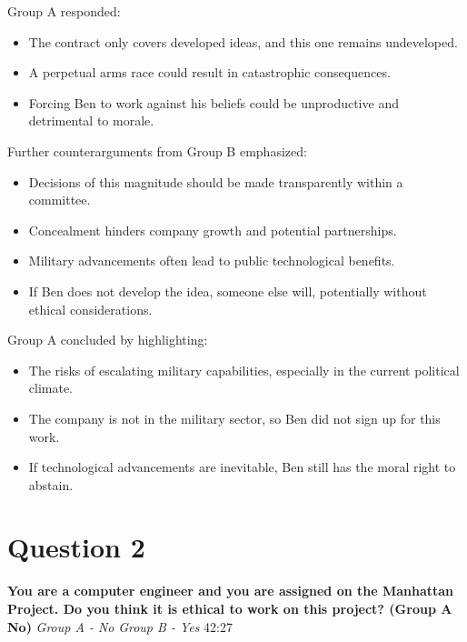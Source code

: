 \documentclass[12pt]{article}
\begin{document}
\noindent Group A responded:
{\fontsize{11pt}{13pt}\selectfont
\begin{itemize}
\setlength{\itemsep}{4pt}
    \item The contract only covers developed ideas, and this one remains undeveloped.
    \item A perpetual arms race could result in catastrophic consequences.
    \item Forcing Ben to work against his beliefs could be unproductive and detrimental to morale.
\end{itemize}
}

\noindent Further counterarguments from Group B emphasized:
{\fontsize{11pt}{13pt}\selectfont
\begin{itemize}
\setlength{\itemsep}{4pt} 
    \item Decisions of this magnitude should be made transparently within a committee.
    \item Concealment hinders company growth and potential partnerships.
    \item Military advancements often lead to public technological benefits.
    \item If Ben does not develop the idea, someone else will, potentially without ethical considerations.
\end{itemize}
}

\noindent Group A concluded by highlighting:
{\fontsize{11pt}{13pt}\selectfont
\begin{itemize}
\setlength{\itemsep}{4pt} 
    \item The risks of escalating military capabilities, especially in the current political climate.
    \item The company is not in the military sector, so Ben did not sign up for this work.
    \item If technological advancements are inevitable, Ben still has the moral right to abstain.
\end{itemize}
}

\section{Question 2}
\textbf{You are a computer engineer and you are assigned on the Manhattan Project. Do you think it is ethical to work on this project? (Group A No)}
\textit {Group A - No}
\textit {Group B - Yes}
42:27
\end{document}
